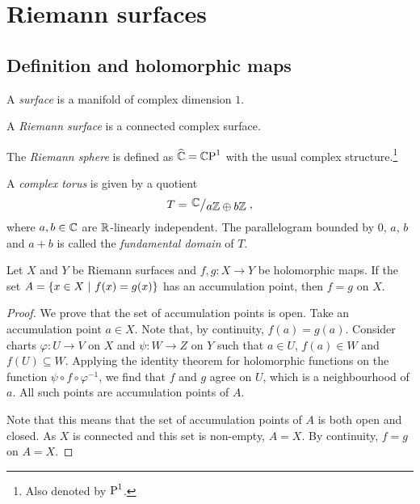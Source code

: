 \section{Riemann surfaces}

\subsection{Definition and holomorphic maps}


\begin{definicija}
A \emph{surface} is a manifold of complex dimension
$1$.
\end{definicija}

\begin{definicija}
A \emph{Riemann surface} is a connected
complex surface.
\end{definicija}

\begin{definicija}
The \emph{Riemann sphere} is defined as
$\widehat{\mathbb{C}} = \mathbb{C}\!\operatorname{P}^{1}$ with the usual complex
structure.\footnote{Also denoted by ${}\!\operatorname{P}^{1}$.}
\end{definicija}

\begin{definicija}
A \emph{complex torus} is given by a quotient
\[
T = \kvoc{\C}{a\Z \oplus b\Z},
\]
where $a, b \in \mathbb{C}$ are $\mathbb{R}$-linearly independent. The
parallelogram bounded by $0$, $a$, $b$ and $a+b$ is called the
\emph{fundamental domain} of $T$.
\end{definicija}

\begin{izrek}[Identity]
Let $X$ and $Y$ be Riemann surfaces and $f, g \colon X \to Y$ be
holomorphic maps. If the set $A = \left\{x \in X~\middle\vert~f(x) = g(x)\right\}$ has
an accumulation point, then $f = g$ on $X$.
\end{izrek}

\begin{proof}
We prove that the set of accumulation points is open. Take an
accumulation point $a \in X$. Note that, by continuity,
$f(a) = g(a)$. Consider charts $\varphi \colon U \to V$ on $X$ and
$\psi \colon W \to Z$ on $Y$ such that $a \in U$, $f(a) \in W$ and
$f(U) \subseteq W$. Applying the identity theorem for holomorphic
functions on the function $\psi \circ f \circ \varphi^{-1}$, we
find that $f$ and $g$ agree on $U$, which is a neighbourhood of
$a$. All such points are accumulation points of $A$.

Note that this means that the set of accumulation points of $A$ is
both open and closed. As $X$ is connected and this set is
non-empty, $A = X$. By continuity, $f = g$ on $A = X$.
\end{proof}

